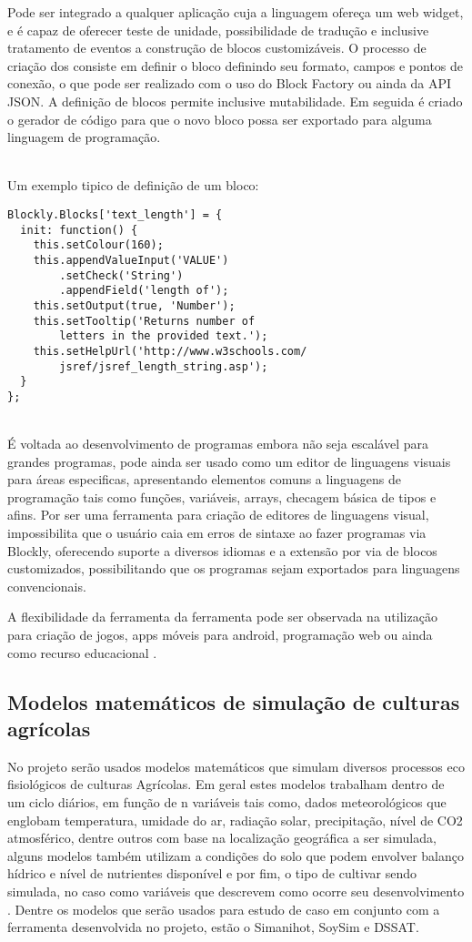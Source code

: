 \documentclass[12pt]{article}
\begin{document}
	Pode ser integrado a qualquer aplicação cuja a linguagem ofereça um web widget, e é capaz de oferecer teste de unidade, possibilidade de tradução e inclusive tratamento de eventos a construção de blocos customizáveis. O processo de criação dos consiste em definir o bloco definindo seu formato, campos e pontos de conexão, o que pode ser realizado com o uso do Block Factory ou ainda da API JSON. A definição de blocos permite inclusive mutabilidade. Em seguida é criado o gerador de código para que o novo bloco possa ser exportado para alguma linguagem de programação.
	
	~\\
	Um exemplo tipico de definição de um bloco:
	

	\begin{lstlisting}[frame=single]
Blockly.Blocks['text_length'] = {
  init: function() {
	this.setColour(160);
	this.appendValueInput('VALUE')
		.setCheck('String')
		.appendField('length of');
	this.setOutput(true, 'Number');
	this.setTooltip('Returns number of 
		letters in the provided text.');
	this.setHelpUrl('http://www.w3schools.com/
		jsref/jsref_length_string.asp');
  }
};
    \end{lstlisting}
    
	~\\
	É voltada ao desenvolvimento de programas embora não seja escalável para grandes programas, pode ainda ser usado como um editor de linguagens visuais para áreas especificas, apresentando elementos comuns a linguagens de programação tais como funções, variáveis, arrays, checagem básica de tipos e afins. Por ser uma ferramenta para criação de editores de linguagens visual, impossibilita que o usuário caia em erros de sintaxe ao fazer programas via Blockly, oferecendo suporte a diversos idiomas e a extensão por via de blocos customizados, possibilitando que os programas sejam exportados para linguagens convencionais.

	A flexibilidade da ferramenta da ferramenta pode ser observada na utilização para criação de jogos, apps móveis para android, programação web ou ainda como recurso educacional \cite{blocklyGames,blocklymobile,blocklyJavaScript,blocklyEducation}.
	
	\subsection{Modelos matemáticos de simulação de culturas agrícolas}
	
	No projeto serão usados modelos matemáticos que simulam diversos processos eco fisiológicos de culturas Agrícolas. Em geral estes modelos trabalham dentro de um ciclo diários, em função de n variáveis tais como, dados meteorológicos que englobam temperatura, umidade do ar, radiação solar, precipitação, nível de CO2 atmosférico, dentre outros com base na localização geográfica a ser simulada, alguns modelos também utilizam a condições do solo que podem envolver balanço hídrico e nível de nutrientes disponível e por fim, o tipo de cultivar sendo simulada, no caso como variáveis que descrevem como ocorre seu desenvolvimento \cite{simanihotArt}. Dentre os modelos que serão usados para estudo de caso em conjunto com a ferramenta desenvolvida no projeto, estão o Simanihot, SoySim e DSSAT.
\end{document}
